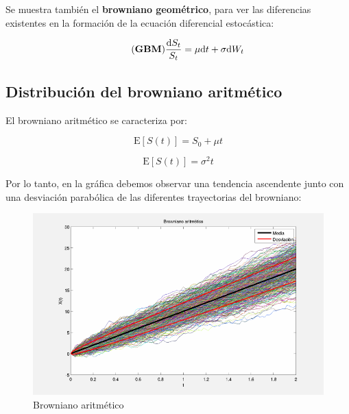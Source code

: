 \documentclass[a4paper,11pt]{article}
\begin{document}
Se muestra tambi\'en el \textbf{browniano geom\'etrico}, para ver las diferencias
existentes en la formaci\'on de la ecuaci\'on diferencial estoc\'astica:

\begin{equation*}
   \tag{\textbf{GBM}}
   \frac{\mathrm{d}S_t}{S_t} = \mu\mathrm{d}t + \sigma\mathrm{d}W_t
\end{equation*}

\subsection{Distribuci\'on del browniano aritm\'etico}

El browniano aritm\'etico se caracteriza por:

\begin{equation*}
   \tag{Media}
   \mathrm{E}[S(t)] = S_0 + \mu t
\end{equation*}

\begin{equation*}
   \tag{Varianza}
   \mathrm{E}[S(t)] = \sigma^2 t
\end{equation*}

Por lo tanto, en la gr\'afica debemos observar una tendencia ascendente junto con
una desviaci\'on parab\'olica de las diferentes trayectorias del browniano:\\

\begin{figure}[htb]
   \begin{center}
      \includegraphics[scale=0.5,
      keepaspectratio]{./figures/ABM.png}
   \end{center}
   \caption{Browniano aritm\'etico}
\end{figure}
\end{document}
